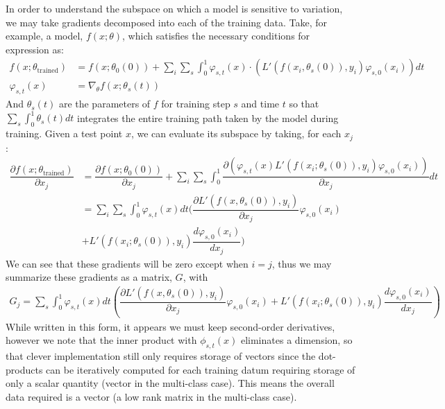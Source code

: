 In order to understand the subspace on which a model is sensitive to variation, we may take gradients decomposed into each of the training data. Take, for example, a model, $f(x; \theta)$, which satisfies the necessary conditions for expression as:
\begin{align}
    f(x; \theta_\text{trained}) &= f(x; \theta_0(0)) + \sum_i \sum_s \int_0^1 \varphi_{s,t}(x) \cdot (L'(f(x_i, \theta_s(0)), y_i) \varphi_{s, 0}(x_i)) dt\\
    \varphi_{s,t}(x) &= \nabla_\theta f(x; \theta_s(t))
\end{align}
And $\theta_s(t)$ are the parameters of $f$ for training step $s$ and time $t$ so that $\sum_s \int_0^1 \theta_s(t) dt$ integrates the entire training path taken by the model during training. Given a test point $x$, we can evaluate its subspace by taking, for each $x_j$:
\begin{align}
    \dfrac{\partial f(x; \theta_\text{trained})}{\partial x_j} &= \dfrac{\partial f(x; \theta_0(0))}{\partial x_j} + \sum_i \sum_s \int_0^1 \dfrac{\partial\left(\varphi_{s,t}(x) L'(f(x_i; \theta_s(0)), y_i) \varphi_{s, 0}(x_i)\right)}{\partial x_j} dt\\
                                                               &= \sum_i \sum_s \int_0^1 \varphi_{s,t}(x)dt (\dfrac{\partial L'(f(x, \theta_s(0)), y_i)}{\partial x_j} \varphi_{s, 0}(x_i) \\
                                                               &+ L'(f(x_i; \theta_s(0)), y_i) \dfrac{d\varphi_{s, 0}(x_i)}{dx_j}) 
\end{align}
We can see that these gradients will be zero except when $i = j$, thus we may summarize these gradients as a matrix, $G$, with 
\begin{align}
    G_j = \sum_s \int_0^1 \varphi_{s,t}(x)dt \left(\dfrac{\partial L'(f(x, \theta_s(0)), y_i)}{\partial x_j} \varphi_{s, 0}(x_i) + L'(f(x_i; \theta_s(0)), y_i) \dfrac{d\varphi_{s, 0}(x_i)}{dx_j}\right)
    \label{eq:input_decomp}
\end{align}
While written in this form, it appears we must keep second-order derivatives, however we note that the inner product with $\phi_{s,t}(x)$ eliminates a dimension, so that clever implementation still only requires storage of vectors since the dot-products can be iteratively computed for each training datum requiring storage of only a scalar quantity (vector in the multi-class case). This means the overall data required is a vector (a low rank matrix in the multi-class case). 

